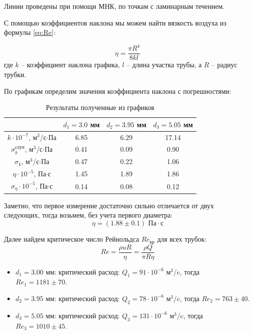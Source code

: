 \documentclass[a4paper,12pt]{article}
\theoremstyle{definition}
\begin{document}
	Линии проведены при помощи МНК, по точкам с ламинарным течением.
	
	С помощью коэффициентов наклона мы можем найти вязкость воздуха из формулы \eqref{eq:Re}:
	
	\begin{equation*}
		\eta = \frac{\pi R^4}{8kl}
	\end{equation*}
	где $k$ -- коэффициент наклона графика, $l$ -- длина участка трубы, а $R$ -- радиус трубки.
	
	По графикам определим значения коэффициента наклона с погрешностями:

	\begin{table}[H]
		\begin{center}
		\bgroup
		\def\arraystretch{1.1}%
			\begin{tabular}{|c|c|c|c|}
				\hline
				&$d_1 = 3.0$ мм&$d_2 = 3.95$ мм&$d_3 = 5.05$ мм\\ \hline
				$k\cdot10^{-7}$, $\text{м}^3$/с$\cdot$Па&6.85&6.29&17.14\\ \hline
				$\sigma_k^{\text{случ}}$, $\text{м}^3$/с$\cdot$Па&0.41&0.09&0.90\\ \hline
				$\sigma_k$, $\text{м}^3$/с$\cdot$Па&0.47& 0.22&1.06 \\ \hline
				$\eta\cdot10^{-5}$, Па$\cdot$с&1.45&1.89&1.86 \\ \hline
				$\sigma_\eta\cdot10^{-5}$, Па$\cdot$с&0.14&0.08&0.12\\ \hline
			\end{tabular}
		\egroup
		\caption{Результаты полученные из графиков}
		\label{highp}
		\end{center}
	\end{table}
	
	Заметно, что первое измерение достаточно сильно отличается от двух следующих, тогда возьмем, без учета первого диаметра:
	\begin{equation*}
		\eta = (1.88\pm 0.1) \text{ Па}\cdot \text{с}
	\end{equation*} 
	
	Далее найдем критическое число Рейнольдса $Re_\text{кр}$ для всех трубок:
	\begin{equation*}
		Re = \frac{\rho u R}{\eta} = \frac{\rho Q}{\pi R \eta}
	\end{equation*}
	\begin{itemize}
		\item $d_1 = 3.00$ мм: критический расход: $Q_1 = 91\cdot10^{-6}\text{ м}^3$/c, тогда $Re_1 = 1181 \pm 70.$
		\item $d_2 = 3.95$ мм: критический расход: $Q_2 = 78\cdot10^{-6}\text{ м}^3$/c, тогда $Re_2 = 763 \pm 40.$  
		\item $d_3 = 5.05$ мм: критический расход: $Q_3 = 131\cdot10^{-6}\text{ м}^3$/c, тогда $Re_3 =  1010\pm 45.$ 
	\end{itemize}
\end{document}
